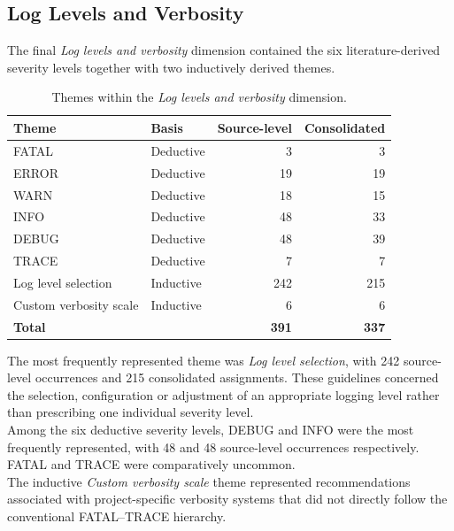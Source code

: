 \subsection{Log Levels and Verbosity}

The final \textit{Log levels and verbosity} dimension contained the six
literature-derived severity levels together with two inductively derived themes.

\begin{table}[H]
    \centering

    \begin{tabularx}{\textwidth}{X l rr}
        \toprule
        \textbf{Theme} &
        \textbf{Basis} &
        \textbf{Source-level} &
        \textbf{Consolidated} \\
        \midrule
        FATAL & Deductive & 3 & 3 \\
        ERROR & Deductive & 19 & 19 \\
        WARN & Deductive & 18 & 15 \\
        INFO & Deductive & 48 & 33 \\
        DEBUG & Deductive & 48 & 39 \\
        TRACE & Deductive & 7 & 7 \\
        Log level selection & Inductive & 242 & 215 \\
        Custom verbosity scale & Inductive & 6 & 6 \\
        \midrule
        \textbf{Total} & & \textbf{391} & \textbf{337} \\
        \bottomrule
    \end{tabularx}

    \caption{Themes within the \textit{Log levels and verbosity} dimension.}
    \label{tab:themes-log-verbosity}
\end{table}

The most frequently represented theme was \textit{Log level selection}, with 242
source-level occurrences and 215 consolidated assignments. These guidelines
concerned the selection, configuration or adjustment of an appropriate logging
level rather than prescribing one individual severity level.
\\
Among the six deductive severity levels, DEBUG and INFO were the most frequently
represented, with 48 and 48 source-level occurrences respectively. FATAL and TRACE
were comparatively uncommon.
\\
The inductive \textit{Custom verbosity scale} theme represented recommendations
associated with project-specific verbosity systems that did not directly follow
the conventional FATAL--TRACE hierarchy.


